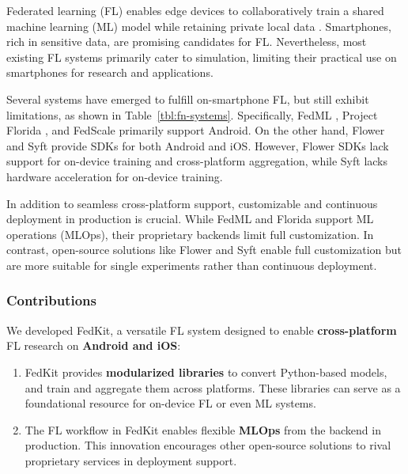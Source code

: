 \documentclass[conference]{IEEEtran}
\begin{document}
Federated learning (FL) enables edge devices to
collaboratively train a shared machine learning (ML) model while
retaining private local data \cite{mcmahan2017communication}.
Smartphones, rich in sensitive data,
are promising candidates for FL.
Nevertheless, most existing FL systems
\cite{bonawitz2019towards,ma2019paddlepaddle,liu2021fate,openfl_citation}
primarily cater to simulation,
limiting their practical use on smartphones for research and applications.

Several systems have emerged to fulfill on-smartphone FL,
but still exhibit limitations,
as shown in Table~\ref{tbl:fn-systems}.
Specifically, FedML \cite{he2020fedml},
Project Florida \cite{madrigal2023project},
and FedScale \cite{lai2022fedscale} primarily support Android.
On the other hand,
Flower \cite{beutel2020flower,mathur2021ondevice} and
Syft \cite{ryffel2018generic,Ziller2021,hall2021syft}
provide SDKs for both Android and iOS.
However, Flower SDKs lack support for on-device training and
cross-platform aggregation,
while Syft lacks hardware acceleration for on-device training.

In addition to seamless cross-platform support,
customizable and continuous deployment in production is crucial.
While FedML and Florida support ML operations (MLOps),
their proprietary backends limit full customization.
In contrast, open-source solutions like Flower and Syft enable
full customization
but are more suitable for single experiments rather than continuous deployment.

\subsubsection{Contributions}
We developed FedKit,
a versatile FL system designed to enable \textbf{cross-platform} FL research on
\textbf{Android and iOS}:
\begin{enumerate}[label=$\bullet$]
    \item FedKit provides \textbf{modularized libraries} to convert
          Python-based models,
          and train and aggregate them across platforms.
          These libraries can serve as a foundational resource for
          on-device FL or even ML systems.
    \item The FL workflow in FedKit
          enables flexible \textbf{MLOps} from
          the backend in production.
          This innovation encourages other open-source solutions to
          rival proprietary services in deployment support.
\end{enumerate}
\end{document}
